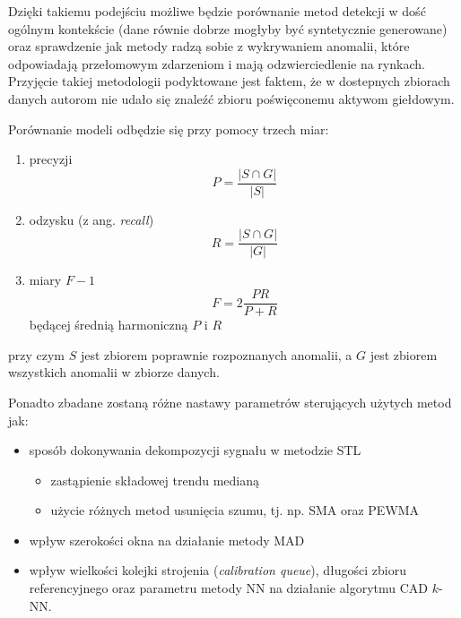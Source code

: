 \documentclass{article}
\begin{document}
Dzięki takiemu podejściu możliwe będzie porównanie metod detekcji w dość
ogólnym kontekście (dane równie dobrze mogłyby być syntetycznie
generowane) oraz sprawdzenie jak metody radzą sobie z wykrywaniem
anomalii, które odpowiadają przełomowym zdarzeniom i mają
odzwierciedlenie na rynkach. Przyjęcie takiej metodologii podyktowane jest faktem, że w dostepnych zbiorach danych autorom nie udało się znaleźć zbioru poświęconemu aktywom giełdowym.

Porównanie modeli odbędzie się przy pomocy trzech miar:

\begin{enumerate}
\def\labelenumi{\arabic{enumi}.}
\item
  precyzji 
    \begin{equation*}
       P = \frac{|S \cap G|}{|S|}
    \end{equation*}
\item
  odzysku (z ang. \emph{recall}) 
    \begin{equation*}
      R = \frac{|S \cap G|}{|G|}
    \end{equation*}

\item
  miary $F-1$
    \begin{equation*}
    F = 2\frac{PR}{P + R}
    \end{equation*}
  będącej średnią harmoniczną \(P\) i \(R\)
\end{enumerate}

przy czym \(S\) jest zbiorem poprawnie rozpoznanych anomalii, a \(G\)
jest zbiorem wszystkich anomalii w zbiorze danych.

Ponadto zbadane zostaną różne nastawy parametrów sterujących użytych
metod jak:

\begin{itemize}
\item
  sposób dokonywania dekompozycji sygnału w metodzie STL

  \begin{itemize}
  \item
    zastąpienie składowej trendu medianą \cite{adts-cloud}
  \item
    użycie różnych metod usunięcia szumu, tj. np. SMA oraz PEWMA
  \end{itemize}
\item
  wpływ szerokości okna na działanie metody MAD
\item
  wpływ wielkości kolejki strojenia (\emph{calibration queue}), długości
  zbioru referencyjnego oraz parametru metody NN na działanie algorytmu
  CAD $k$-NN.
\end{itemize}

 

\end{document}
